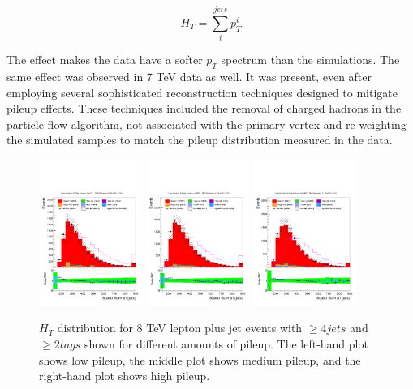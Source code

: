 \begin{equation}
H_{T} = \sum_{i}^{jets} p_{T}^{i}
\end{equation}

\noindent The effect makes the data have a softer $p_{T}$ spectrum
than the simulations.  The same effect was observed in 7 TeV data
as well.  It was present, even after employing several sophisticated
reconstruction techniques designed to mitigate pileup effects.  These
techniques included the removal of charged hadrons in the
particle-flow algorithm, not associated with the primary vertex and
re-weighting the simulated samples to match the pileup distribution
measured in the data.  

\begin{figure}[hbtp]
 \begin{center}
   \includegraphics[width=0.30\textwidth]{Figures/Analysis_1_Diagrams/d2MCPlots_Ht_cut10_4J_2T_lowNPV_Combined.pdf}
   \includegraphics[width=0.30\textwidth]{Figures/Analysis_1_Diagrams/d2MCPlots_Ht_cut11_4J_2T_midNPV_Combined.pdf}
   \includegraphics[width=0.30\textwidth]{Figures/Analysis_1_Diagrams/d2MCPlots_Ht_cut12_4J_2T_highNPV_Combined.pdf}
   \caption{$H_{T}$ distribution for 8 TeV lepton plus jet events with $\geq 4 jets$ and $\geq 2 tags$ shown
   for different amounts of pileup. The left-hand plot shows low pileup, the middle plot shows
   medium pileup, and the right-hand plot shows high pileup.}
   \label{fig:HTreweight}
 \end{center}
\end{figure}



